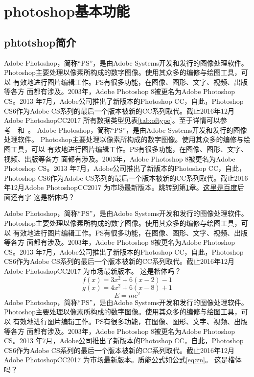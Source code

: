 
\mylineskip
\chapter{photoshop基本功能}\label{chaper:ch1}
\section{phtotshop简介}
Adobe Photoshop，简称“PS”，是由Adobe Systems开发和发行的图像处理软件。
Photoshop主要处理以像素所构成的数字图像。使用其众多的编修与绘图工具，可以
有效地进行图片编辑工作。PS有很多功能，在图像、图形、文字、视频、出版等各方
面都有涉及。2003年，Adobe Photoshop 8被更名为Adobe Photoshop CS。2013
年7月，Adobe公司推出了新版本的Photoshop CC，自此，Photoshop CS6作为Adobe
 CS系列的最后一个版本被新的CC系列取代。截止2016年12月Adobe PhotoshopCC2017
 所有数据类型见表\ref{tab:oftype}。至于详情可以参考~\cite{gzp}~和~\cite{nue}。
\oftypetable
 Adobe Photoshop，简称“PS”，是由Adobe Systems开发和发行的图像处理软件。
 Photoshop主要处理以像素所构成的数字图像。使用其众多的编修与绘图工具，可以
 有效地进行图片编辑工作。PS有很多功能，在图像、图形、文字、视频、出版等各方
 面都有涉及。2003年，Adobe Photoshop 8被更名为Adobe Photoshop CS。2013
 年7月，Adobe公司推出了新版本的Photoshop CC，自此，Photoshop CS6作为Adobe
 CS系列的最后一个版本被新的CC系列取代。截止2016年12月Adobe PhotoshopCC2017
 为市场最新版本。跳转到第\ref{chaper:ch1}章。\href{http://www.baidu.com}{这里是百度}后面还有字
 {\kaishu 这是楷体吗？}
 
  Adobe Photoshop，简称“PS”，是由Adobe Systems开发和发行的图像处理软件。
 Photoshop主要处理以像素所构成的数字图像。使用其众多的编修与绘图工具，可以
 有效地进行图片编辑工作。PS有很多功能，在图像、图形、文字、视频、出版等各方
 面都有涉及。2003年，Adobe Photoshop 8被更名为Adobe Photoshop CS。2013
 年7月，Adobe公司推出了新版本的Photoshop CC，自此，Photoshop CS6作为Adobe
 CS系列的最后一个版本被新的CC系列取代。截止2016年12月Adobe PhotoshopCC2017
 为市场最新版本。
 {\kaishu 这是楷体吗？}
\setlength{\abovedisplayskip}{0pt}
\setlength{\belowdisplayskip}{0pt}
 \begin{equation}\label{eq:fx}
 f(x)=3x^{2}+6(x-2)-1
 \end{equation}
 \begin{equation}\label{eq:gx}
g(x)=4x^{2}+6(x-8)+1
\end{equation}
 \begin{equation}\label{eq:zn}
E=mc^2
\end{equation}
  Adobe Photoshop，简称“PS”，是由Adobe Systems开发和发行的图像处理软件。
 Photoshop主要处理以像素所构成的数字图像。使用其众多的编修与绘图工具，可以
 有效地进行图片编辑工作。PS有很多功能，在图像、图形、文字、视频、出版等各方
 面都有涉及。2003年，Adobe Photoshop 8被更名为Adobe Photoshop CS。2013
 年7月，Adobe公司推出了新版本的Photoshop CC，自此，Photoshop CS6作为Adobe
 CS系列的最后一个版本被新的CC系列取代。截止2016年12月Adobe PhotoshopCC2017
 为市场最新版本。质能公式如公式\eqref{eq:zn}。
 {\kaishu 这是楷体吗？}
